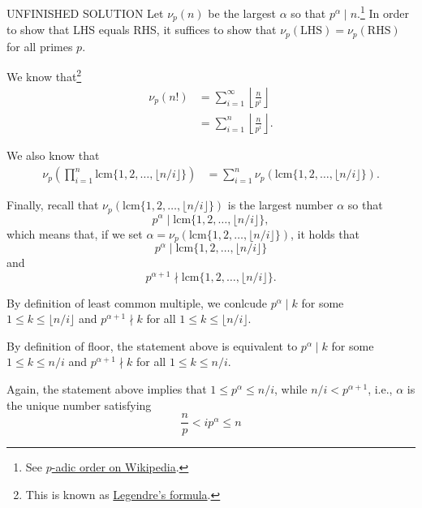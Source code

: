 \begin{sk}{UNFINISHED SOLUTION}{}
	Let \(\nu_p(n)\) be the largest \(\alpha\) so that \(p^\alpha \mid n\).\footnote{See \href{https://en.wikipedia.org/wiki/P-adic_order}{\(p\)-adic order on Wikipedia}.}
	In order to show that LHS equals RHS, it suffices to show that \(\nu_p(\mathrm{LHS}) = \nu_p(\mathrm{RHS})\) for all primes \(p\).

	We know that\footnote{This is known as \href{https://en.wikipedia.org/wiki/Legendre's_formula}{Legendre's formula}.}
	\begin{align*}
		\nu_p\left(n!\right) &= \sum_{i=1}^\infty \left\lfloor\frac{n}{p^i}\right\rfloor\\
		&= \sum_{i=1}^n \left\lfloor\frac{n}{p^i}\right\rfloor.
	\end{align*}

	We also know that
	\begin{align*}
		\nu_p\left(\prod_{i=1}^n \mathrm{lcm}\{1, 2, \dots, \lfloor n/i \rfloor\} \right)
		&= \sum_{i=1}^n \nu_p\left(\mathrm{lcm}\{1, 2, \dots, \lfloor n/i \rfloor\} \right).
	\end{align*}


	Finally, recall that \(\nu_p(\mathrm{lcm}\{1, 2, \dots, \lfloor n/i \rfloor\})\) is the largest number \(\alpha\) so that \[
		p^\alpha \mid \mathrm{lcm}\{1, 2, \dots, \lfloor n/i \rfloor\},
	\] which means that, if we set \(\alpha = \nu_p(\mathrm{lcm}\{1, 2, \dots, \lfloor n/i \rfloor\})\), it holds that \[
		p^\alpha \mid \mathrm{lcm}\{1, 2, \dots, \lfloor n/i \rfloor\}
	\] and \[
		p^{\alpha+1} \nmid \mathrm{lcm}\{1, 2, \dots, \lfloor n/i \rfloor\}.
	\]

	By definition of least common multiple, we conlcude \(p^\alpha \mid k\) for some \(1 \leq k \leq \lfloor n/i \rfloor\) and \(p^{\alpha+1} \nmid k\) for all  \(1 \leq k \leq \lfloor n/i \rfloor\).

	By definition of floor, the statement above is equivalent to 
	\(p^\alpha \mid k\) for some \(1 \leq k \leq n/i\) and \(p^{\alpha+1} \nmid k\) for all  \(1 \leq k \leq n/i\).

	Again, the statement above implies that \(1 \leq p^\alpha \leq n/i\), while \(n/i < p^{\alpha+1}\), i.e., \(\alpha\) is the unique number satisfying \[
		\frac{n}{p} < ip^{\alpha} \leq n
	\]
\end{sk}
